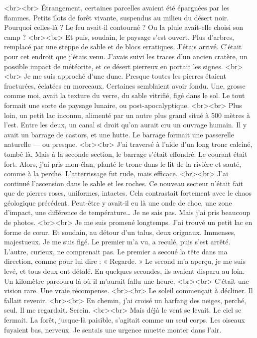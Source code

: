 <br><br>
Étrangement, certaines parcelles avaient été épargnées par les flammes. Petits îlots de forêt vivante, suspendus au milieu du désert noir. Pourquoi celles-là ? Le feu avait-il contourné ? Ou la pluie avait-elle choisi son camp ?
<br><br>
Et puis, soudain, le paysage s’est ouvert. Plus d’arbres, remplacé par une steppe de sable et de blocs erratiques. J’étais arrivé. C’était pour cet endroit que j’étais venu. J’avais suivi les traces d’un ancien cratère, un possible impact de météorite, et ce désert pierreux en portait les signes.
<br><br>
Je me suis approché d’une dune. Presque toutes les pierres étaient fracturées, éclatées en morceaux. Certaines semblaient avoir fondu. Une, grosse comme moi, avait la texture du verre, du sable vitrifié, figé dans le sol. Le tout formait une sorte de paysage lunaire, ou post-apocalyptique.
<br><br>
Plus loin, un petit lac inconnu, alimenté par un autre plus grand situé à 500 mètres à l’est. Entre les deux, un canal si droit qu’on aurait cru un ouvrage humain. Il y avait un barrage de castors, et une hutte. Le barrage formait une passerelle naturelle — ou presque.
<br><br>
J’ai traversé à l’aide d’un long tronc calciné, tombé là. Mais à la seconde section, le barrage s’était effondré. Le courant était fort. Alors, j’ai pris mon élan, planté le tronc dans le lit de la rivière et sauté, comme à la perche. L’atterrissage fut rude, mais efficace.
<br><br>
J’ai continué l’ascension dans le sable et les roches. Ce nouveau secteur n’était fait que de pierres roses, uniformes, intactes. Cela contrastait fortement avec le chaos géologique précédent. Peut-être y avait-il eu là une onde de choc, une zone d’impact, une différence de température… Je ne sais pas. Mais j’ai pris beaucoup de photos.
<br><br>
Je me suis promené longtemps. J’ai trouvé un petit lac en forme de cœur. Et soudain, au détour d’un talus, deux orignaux. Immenses, majestueux. Je me suis figé. Le premier m’a vu, a reculé, puis s’est arrêté. L’autre, curieux, ne comprenait pas. Le premier a secoué la tête dans ma direction, comme pour lui dire : « Regarde. » Le second m’a aperçu, je me suis levé, et tous deux ont détalé. En quelques secondes, ils avaient disparu au loin. Un kilomètre parcouru là où il m’aurait fallu une heure.
<br><br>
C’était une vision rare. Une vraie récompense.
<br><br>
Le soleil commençait à décliner. Il fallait revenir.
<br><br>
En chemin, j’ai croisé un harfang des neiges, perché, seul. Il me regardait. Serein.
<br><br>
Mais déjà le vent se levait. Le ciel se fermait. La forêt, jusque-là paisible, s’agitait comme un seul corps. Les oiseaux fuyaient bas, nerveux. Je sentais une urgence muette monter dans l’air.
